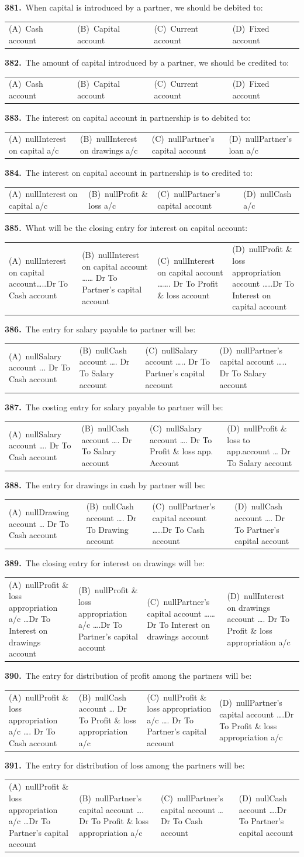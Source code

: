 \documentclass[11pt,a4paper]{article}
\makeatletter
\newcommand{\mcq}[6]{%
  \Needspace{4\baselineskip}%
  \par\medskip\noindent\textbf{#1.}\ #2\par\nopagebreak
  \noindent\begin{tabularx}{\linewidth}{@{\hspace{1.5em}}*{4}{>{\raggedright\arraybackslash}X}@{}}
    (A)~#3 & (B)~#4 & (C)~#5 & (D)~#6
  \end{tabularx}\par}
\makeatother
\begin{document}
\mcq{381}{When capital is introduced by a partner, we should be debited to:}{Cash account}{Capital account}{Current account}{Fixed account}
\mcq{382}{The amount of capital introduced by a partner, we should be credited to:}{Cash account}{Capital account}{Current account}{Fixed account}
\mcq{383}{The interest on capital account in partnership is to debited to:}{nullInterest on capital a/c}{nullInterest on drawings a/c}{nullPartner’s capital account}{nullPartner’s loan a/c}
\mcq{384}{The interest on capital account in partnership is to credited to:}{nullInterest on capital a/c}{nullProfit \& loss a/c}{nullPartner’s capital account}{nullCash a/c}
\mcq{385}{What will be the closing entry for interest on capital account:}{nullInterest on capital account…..Dr To Cash account}{nullInterest on capital account …… Dr To Partner’s capital account}{nullInterest on capital account ……. Dr To Profit \& loss account}{nullProfit \& loss appropriation account …..Dr To Interest on capital account}
\mcq{386}{The entry for salary payable to partner will be:}{nullSalary account ... Dr To Cash account}{nullCash account …. Dr To Salary account}{nullSalary account ….. Dr To Partner’s capital account}{nullPartner’s capital account ….. Dr To Salary account}
\mcq{387}{The costing entry for salary payable to partner will be:}{nullSalary account …. Dr To Cash account}{nullCash account …. Dr To Salary account}{nullSalary account …. Dr To Profit \& loss app. Account}{nullProfit \& loss to app.account … Dr To Salary account}
\mcq{388}{The entry for drawings in cash by partner will be:}{nullDrawing account … Dr To Cash account}{nullCash account …. Dr To Drawing account}{nullPartner’s capital account …..Dr To Cash account}{nullCash account …. Dr To Partner’s capital account}
\mcq{389}{The closing entry for interest on drawings will be:}{nullProfit \& loss appropriation a/c …Dr To Interest on drawings account}{nullProfit \& loss appropriation a/c ….Dr To Partner’s capital account}{nullPartner’s capital account ……Dr To Interest on drawings account}{nullInterest on drawings account …. Dr To Profit \& loss appropriation a/c}
\mcq{390}{The entry for distribution of profit among the partners will be:}{nullProfit \& loss appropriation a/c …. Dr To Cash account}{nullCash account … Dr To Profit \& loss appropriation a/c}{nullProfit \& loss appropriation a/c …. Dr To Partner’s capital account}{nullPartner’s capital account ….Dr To Profit \& loss appropriation a/c}
\mcq{391}{The entry for distribution of loss among the partners will be:}{nullProfit \& loss appropriation a/c …Dr To Partner’s capital account}{nullPartner’s capital account …. Dr To Profit \& loss appropriation a/c}{nullPartner’s capital account … Dr To Cash account}{nullCash account ….Dr To Partner’s capital account}
\end{document}
